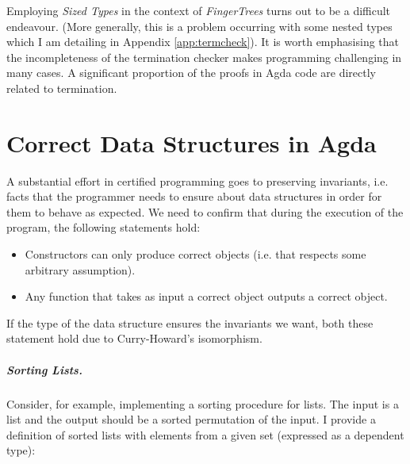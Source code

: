 \documentclass[12pt,twoside,notitlepage]{report}
\begin{document}
Employing \textit{Sized Types} in the context of \textit{FingerTrees} turns out to be a difficult endeavour. (More generally, this is a problem occurring with some nested types which I am detailing in Appendix \ref{app:termcheck}). It is worth emphasising that the incompleteness \cite{certified} of the termination checker makes programming challenging in many cases. A significant proportion of the proofs in Agda code are directly related to termination. 

\section{Correct Data Structures in Agda}

A substantial effort in certified programming goes to preserving invariants, i.e. facts that the programmer needs to ensure about data structures in order for them to behave as expected. 
We need to confirm that during the execution of the program, the following statements hold:
\begin{itemize}
\item Constructors can only produce correct objects (i.e. that respects some arbitrary assumption).
\item Any function that takes as input a correct object outputs a correct object.
\end{itemize}

If the type of the data structure ensures the invariants we want, both these statement hold due to Curry-Howard's isomorphism.

\subparagraph{Sorting Lists.}
\label{par:sort}
Consider, for example, implementing a sorting procedure for lists. The input is a list and the output should be a sorted permutation of the input.
I provide a definition of sorted lists with elements from a given set (expressed as a dependent type):
\end{document}
